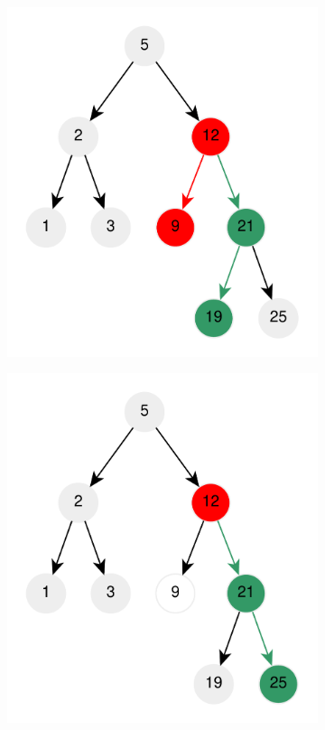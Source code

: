 \begin{figure}
\begin{subfigure}[b]{0.3\textwidth}
		\includegraphics[width=\textwidth]{sources/distance_between_nodes_in_tree/images/example4}
		\caption{}
		\label{fig:distance_between_nodes_in_tree:example4}
	\end{subfigure}
	\hfill
	\begin{subfigure}[b]{0.3\textwidth}
		\centering
		\includegraphics[width=\textwidth]{sources/distance_between_nodes_in_tree/images/example5}

\end{subfigure}
\end{figure}

